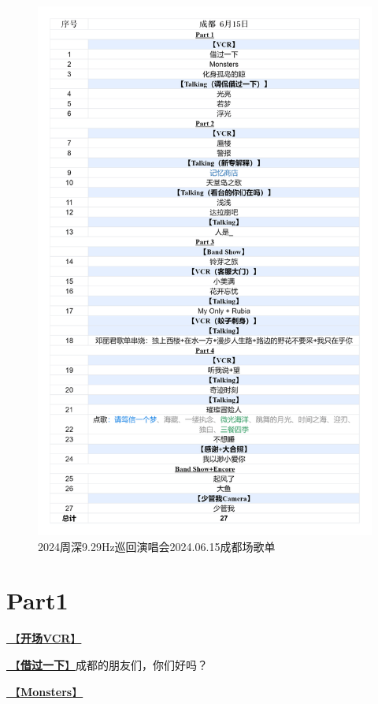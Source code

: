 \documentclass[]{ctexbook}
\begin{document}
\begin{figure}

{\centering \includegraphics[width=320pt]{img/playlists/playlists-chengdu-20240615} 

}

\caption{2024周深9.29Hz巡回演唱会2024.06.15成都场歌单}\label{fig:unnamed-chunk-47}
\end{figure}

\newpage

\section{Part1}\label{chengdu-20240615-part1}

\hyperref[opening-vcr]{🎥【\textbf{开场VCR}】}

\hyperref[I-will-go-my-way]{🎵【\textbf{借过一下}】}成都的朋友们，你们好吗？

\hyperref[Monsters]{🎵【\textbf{Monsters}】}
\end{document}
